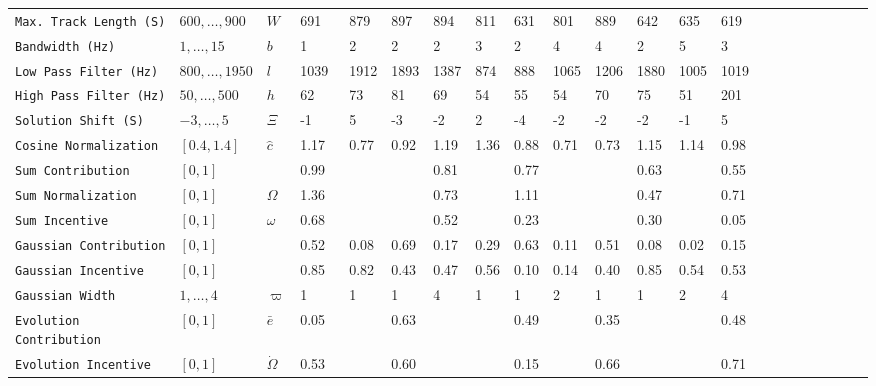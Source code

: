 \documentclass[twocolumn]{article}
\begin{document}
\begin{table}[h]
{\begin{tabular}{llll@{}llllllllllllllllll@{}}
		\texttt{Max. Track Length (S) }     & $600,\ldots,900$  & $W$        & 691   & 879  & 897  & 894  & 811  & 631  & 801  & 889  & 642  & 635  & 619  &  \\
		\texttt{Bandwidth (Hz)      }       & $1,\ldots,15$     & $b$        & 1     & 2    & 2    & 2    & 3    & 2    & 4    & 4    & 2    & 5    & 3    &  \\
		\texttt{Low Pass Filter (Hz) }      & $800,\ldots,1950$ & $l$        & 1039~ & 1912 & 1893 & 1387 & 874  & 888  & 1065 & 1206 & 1880 & 1005 & 1019 &  \\
		\texttt{High Pass Filter (Hz)}      & $50,\ldots,500$   & $h$        & 62    & 73   & 81   & 69   & 54   & 55   & 54   & 70   & 75   & 51   & 201  &  \\
		\texttt{Solution Shift (S) }        & $-3,\ldots,5$     & $ \varXi $ & -1    & 5    & -3   & -2   & 2    & -4   & -2   & -2   & -2   & -1   & 5    &  \\
		\texttt{Cosine Normalization }      & $[0.4,1.4]$       & $\hat c$   & 1.17  & 0.77 & 0.92 & 1.19 & 1.36 & 0.88 & 0.71 & 0.73 & 1.15 & 1.14 & 0.98 &  \\ \midrule
		\texttt{Sum Contribution  }         & $[0,1]$           &            & 0.99  &      &      & 0.81 &      & 0.77 &      &      & 0.63 &      & 0.55 &  \\
		\texttt{Sum Normalization }         & $[0,1]$           &    $\Omega$        & 1.36  &      &      & 0.73 &      & 1.11 &      &      & 0.47 &      & 0.71 &  \\
		\texttt{Sum Incentive      }        & $[0,1]$           &     $\omega$       & 0.68  &      &      & 0.52 &      & 0.23 &      &      & 0.30 &      & 0.05 &  \\ \midrule
		\texttt{Gaussian Contribution  }    & $[0,1]$           &            & 0.52  & 0.08 & 0.69 & 0.17 & 0.29 & 0.63 & 0.11 & 0.51 & 0.08 & 0.02 & 0.15 &  \\
		\texttt{Gaussian Incentive}         & $[0,1]$           &            & 0.85  & 0.82 & 0.43 & 0.47 & 0.56 & 0.10 & 0.14 & 0.40 & 0.85 & 0.54 & 0.53 &  \\
		\texttt{Gaussian Width  }           & $1,\ldots,4$      & $\varpi$   & 1     & 1    & 1    & 4    & 1    & 1    & 2    & 1    & 1    & 2    & 4    &  \\ \midrule
		\texttt{Evolution Contribution}     & $[0,1]$           &     $\bar e$       & 0.05  &      & 0.63 &      &      & 0.49 &      & 0.35 &      &      & 0.48 &  \\
		\texttt{Evolution Incentive}        & $[0,1]$           &    $\dot \Omega$        & 0.53  &      & 0.60 &      &      & 0.15 &      & 0.66 &      &      & 0.71 &  \\

\end{tabular}}
\end{table}
\end{document}
